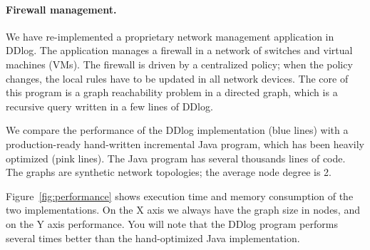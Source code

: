 \paragraph{Firewall management.}

We have re-implemented a proprietary network management application in
DDlog.  The application manages a firewall in a network of switches
and virtual machines (VMs).  The firewall is driven by a centralized
policy; when the policy changes, the local rules have to be updated in
all network devices.  The core of this program is a graph reachability
problem in a directed graph, which is a recursive query written in a
few lines of DDlog.

We compare the performance of the DDlog implementation (blue lines)
with a production-ready hand-written incremental Java program, which
has been heavily optimized (pink lines).  The Java program has several
thousands lines of code.  The graphs are synthetic network topologies;
the average node degree is 2.

Figure~\ref{fig:performance} shows execution time and memory
consumption of the two implementations.  On the X axis we always have
the graph size in nodes, and on the Y axis performance.  You will note
that the DDlog program performs several times better than the
hand-optimized Java implementation.

